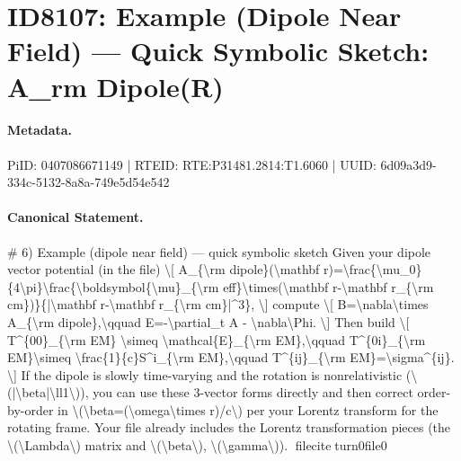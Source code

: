 \section*{ID8107: Example (Dipole Near Field) — Quick Symbolic Sketch: A\_rm Dipole(R)}
\paragraph{Metadata.}
PiID: 0407086671149 | RTEID: RTE:P31481.2814:T1.6060 | UUID: 6d09a3d9-334c-5132-8a8a-749e5d54e542

\paragraph{Canonical Statement.}
\# 6) Example (dipole near field) — quick symbolic sketch Given your dipole vector potential (in the file) \textbackslash{}[ A\_\{\textbackslash{}rm dipole\}(\textbackslash{}mathbf r)=\textbackslash{}frac\{\textbackslash{}mu\_0\}\{4\textbackslash{}pi\}\textbackslash{}frac\{\textbackslash{}boldsymbol\{\textbackslash{}mu\}\_\{\textbackslash{}rm eff\}\textbackslash{}times(\textbackslash{}mathbf r-\textbackslash{}mathbf r\_\{\textbackslash{}rm cm\})\}\{|\textbackslash{}mathbf r-\textbackslash{}mathbf r\_\{\textbackslash{}rm cm\}|\textasciicircum{}3\}, \textbackslash{}] compute \textbackslash{}[ B=\textbackslash{}nabla\textbackslash{}times A\_\{\textbackslash{}rm dipole\},\textbackslash{}qquad E=-\textbackslash{}partial\_t A - \textbackslash{}nabla\textbackslash{}Phi. \textbackslash{}] Then build \textbackslash{}[ T\textasciicircum{}\{00\}\_\{\textbackslash{}rm EM\} \textbackslash{}simeq \textbackslash{}mathcal\{E\}\_\{\textbackslash{}rm EM\},\textbackslash{}qquad T\textasciicircum{}\{0i\}\_\{\textbackslash{}rm EM\}\textbackslash{}simeq \textbackslash{}frac\{1\}\{c\}S\textasciicircum{}i\_\{\textbackslash{}rm EM\},\textbackslash{}qquad T\textasciicircum{}\{ij\}\_\{\textbackslash{}rm EM\}=\textbackslash{}sigma\textasciicircum{}\{ij\}. \textbackslash{}] If the dipole is slowly time-varying and the rotation is nonrelativistic (\textbackslash{}(|\textbackslash{}beta|\textbackslash{}ll1\textbackslash{})), you can use these 3-vector forms directly and then correct order-by-order in \textbackslash{}(\textbackslash{}beta=(\textbackslash{}omega\textbackslash{}times r)/c\textbackslash{}) per your Lorentz transform for the rotating frame. Your file already includes the Lorentz transformation pieces (the \textbackslash{}(\textbackslash{}Lambda\textbackslash{}) matrix and \textbackslash{}(\textbackslash{}beta\textbackslash{}), \textbackslash{}(\textbackslash{}gamma\textbackslash{})). fileciteturn0file0


